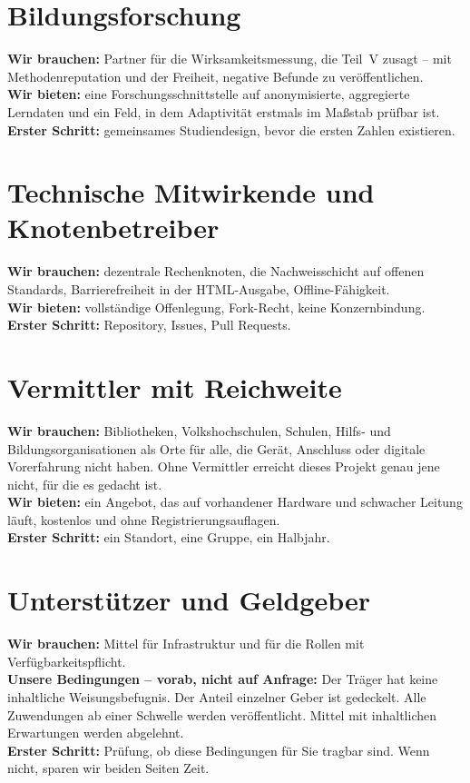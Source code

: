 \documentclass[11pt,a4paper]{article}
\begin{document}
\section{Bildungsforschung}
\textbf{Wir brauchen:} Partner für die Wirksamkeitsmessung, die Teil~V zusagt -- mit Methodenreputation und der Freiheit, negative Befunde zu veröffentlichen.\\
\textbf{Wir bieten:} eine Forschungsschnittstelle auf anonymisierte, aggregierte Lerndaten und ein Feld, in dem Adaptivität erstmals im Maßstab prüfbar ist.\\
\textbf{Erster Schritt:} gemeinsames Studiendesign, bevor die ersten Zahlen existieren.

\section{Technische Mitwirkende und Knotenbetreiber}
\textbf{Wir brauchen:} dezentrale Rechenknoten, die Nachweisschicht auf offenen Standards, Barrierefreiheit in der HTML-Ausgabe, Offline-Fähigkeit.\\
\textbf{Wir bieten:} vollständige Offenlegung, Fork-Recht, keine Konzernbindung.\\
\textbf{Erster Schritt:} Repository, Issues, Pull Requests.

\section{Vermittler mit Reichweite}
\textbf{Wir brauchen:} Bibliotheken, Volkshochschulen, Schulen, Hilfs- und Bildungsorganisationen als Orte für alle, die Gerät, Anschluss oder digitale Vorerfahrung nicht haben. Ohne Vermittler erreicht dieses Projekt genau jene nicht, für die es gedacht ist.\\
\textbf{Wir bieten:} ein Angebot, das auf vorhandener Hardware und schwacher Leitung läuft, kostenlos und ohne Registrierungsauflagen.\\
\textbf{Erster Schritt:} ein Standort, eine Gruppe, ein Halbjahr.

\section{Unterstützer und Geldgeber}
\textbf{Wir brauchen:} Mittel für Infrastruktur und für die Rollen mit Verfügbarkeitspflicht.\\
\textbf{Unsere Bedingungen -- vorab, nicht auf Anfrage:} Der Träger hat keine inhaltliche Weisungsbefugnis. Der Anteil einzelner Geber ist gedeckelt. Alle Zuwendungen ab einer Schwelle werden veröffentlicht. Mittel mit inhaltlichen Erwartungen werden abgelehnt.\\
\textbf{Erster Schritt:} Prüfung, ob diese Bedingungen für Sie tragbar sind. Wenn nicht, sparen wir beiden Seiten Zeit.
\end{document}
